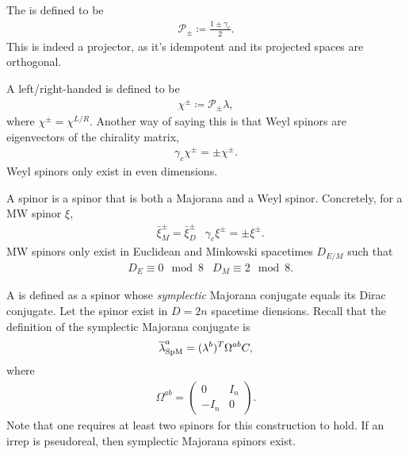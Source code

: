 \documentclass[11pt]{article}
\begin{document}
\begin{definition}
    The  is defined to be
    \begin{align*}
        \mathcal{P}_{\pm} \coloneqq \frac{1 \pm \gamma_c}{2}.
    \end{align*}
    This is indeed a projector, as it's idempotent and
    its projected spaces are orthogonal.
\end{definition}

\begin{definition}
    A left/right-handed  is defined to be
    \begin{align*}
        \chi^{\pm} \coloneqq \mathcal{P}_{\pm} \lambda,
    \end{align*}
    where $\chi^{\pm} = \chi^{L/R}$. Another way of saying this 
    is that Weyl spinors are eigenvectors of the chirality matrix,
    \begin{align*}
        \gamma_c \chi^{\pm} = \pm \chi^{\pm}.
    \end{align*}
    Weyl spinors only exist in even dimensions.
\end{definition}

\begin{definition}
    A  spinor is a spinor that is both a
    Majorana and a Weyl spinor. Concretely, for a MW spinor $\xi$,
    \begin{align*}
        & \bar{\xi}^{\pm}_M = \bar{\xi}^{\pm}_D
        & \gamma_c \xi^{\pm} = \pm \xi^{\pm}.
    \end{align*}
    MW spinors only exist in Euclidean and Minkowski spacetimes $D_{E/M}$ 
    such that
    \begin{align*}
        & D_E \equiv 0 \mod 8
        & D_M \equiv 2 \mod 8.
    \end{align*}
\end{definition}

\begin{definition}
    A  is defined as a spinor
    whose \emph{symplectic} Majorana conjugate equals its Dirac conjugate.
    Let the spinor exist in $D = 2n$ spacetime diensions.
    Recall that the definition of the symplectic Majorana conjugate is
    \begin{align*}
        \bar{\lambda}_{\rm SpM}^a = (\lambda^b)^T \Omega^{ab} C,
    \end{align*}
    where
    \begin{align*}
        \Omega^{ab} = \begin{pmatrix}
            0 & I_n\\
            - I_n & 0
        \end{pmatrix}.
    \end{align*}
    Note that one requires at least two spinors for this construction
    to hold. If an irrep is pseudoreal, then symplectic Majorana spinors
    exist. 
\end{definition}
\end{document}
